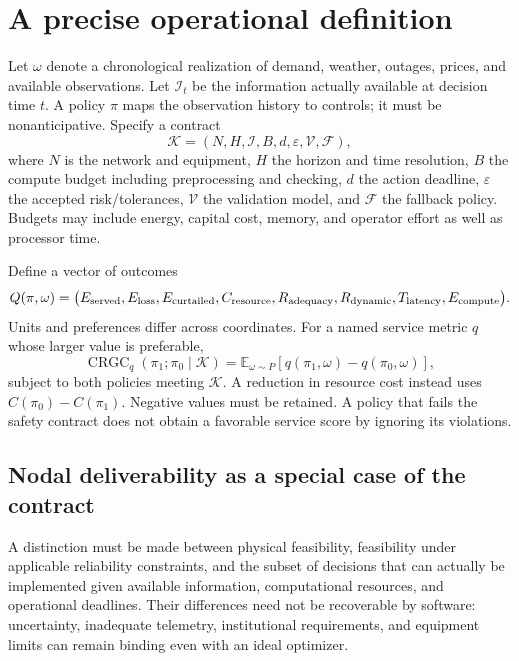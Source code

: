 \documentclass[11pt,letterpaper]{article}
\newcommand{\E}{\mathbb E}\newcommand{\R}{\mathbb R}\newcommand{\CRGC}{\operatorname{CRGC}}
\begin{document}
\section{A precise operational definition}
\label{sec:definition}
Let $\omega$ denote a chronological realization of demand, weather, outages, prices, and available observations. Let $\mathcal I_t$ be the information actually available at decision time $t$. A policy $\pi$ maps the observation history to controls; it must be nonanticipative. Specify a contract
\[
 \mathcal K=(N,H,\mathcal I,B,d,\varepsilon,\mathcal V,\mathcal F),
\]
where $N$ is the network and equipment, $H$ the horizon and time resolution, $B$ the compute budget including preprocessing and checking, $d$ the action deadline, $\varepsilon$ the accepted risk/tolerances, $\mathcal V$ the validation model, and $\mathcal F$ the fallback policy. Budgets may include energy, capital cost, memory, and operator effort as well as processor time.

Define a vector of outcomes
\[
 Q(\pi,\omega)=
 \big(E_{\rm served},E_{\rm loss},E_{\rm curtailed},
 C_{\rm resource},R_{\rm adequacy},R_{\rm dynamic},
 T_{\rm latency},E_{\rm compute}\big).
\]
Units and preferences differ across coordinates. For a named service metric $q$ whose larger value is preferable,
\begin{equation}
 \CRGC_q(\pi_1;\pi_0\mid\mathcal K)
  =\E_{\omega\sim P}\!\left[q(\pi_1,\omega)-q(\pi_0,\omega)\right],
 \label{eq:crgc}
\end{equation}
subject to both policies meeting $\mathcal K$. A reduction in resource cost instead uses $C(\pi_0)-C(\pi_1)$. Negative values must be retained. A policy that fails the safety contract does not obtain a favorable service score by ignoring its violations.

\subsection{Nodal deliverability as a special case of the contract}
A distinction must be made between physical feasibility, feasibility under applicable reliability constraints, and the subset of decisions that can actually be implemented given available information, computational resources, and operational deadlines. Their differences need not be recoverable by software: uncertainty, inadequate telemetry, institutional requirements, and equipment limits can remain binding even with an ideal optimizer.
\end{document}
